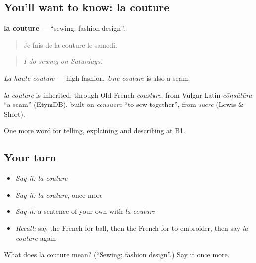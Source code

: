 \subsection*{You'll want to know: la couture}
\textbf{la couture} — \textquotedblleft{}sewing; fashion design\textquotedblright{}.

\begin{quote}
Je fais de la couture le samedi.
\end{quote}

\begin{quote}
\emph{I do sewing on Saturdays.}
\end{quote}

\emph{La haute couture} — high fashion. \emph{Une couture} is also a seam.

\begin{cousinweb}
\emph{la couture} is inherited, through Old French \emph{cousture}, from Vulgar Latin \emph{cōnsūtūra} \textquotedblleft{}a seam\textquotedblright{} (EtymDB), built on \emph{cōnsuere} \textquotedblleft{}to sew together\textquotedblright{}, from \emph{suere} (Lewis \& Short).
\end{cousinweb}

\begin{grammarlens}[title={What you've built}]
One more word for telling, explaining and describing at B1.
\end{grammarlens}

\subsection*{Your turn}
\begin{itemize}
\raggedright
  \item \emph{Say it:} \emph{la couture}
  \item \emph{Say it:} \emph{la couture}, once more
  \item \emph{Say it:} a sentence of your own with \emph{la couture}
  \item \emph{Recall:} say the French for ball, then the French for to embroider, then say \emph{la couture} again
\end{itemize}

\begin{tcolorbox}[breakable,colback=teal!4,colframe=teal!35!black,title={Before you move on}]
What does la couture mean? (\textquotedblleft{}Sewing; fashion design\textquotedblright{}.) Say it once more.
\end{tcolorbox}
